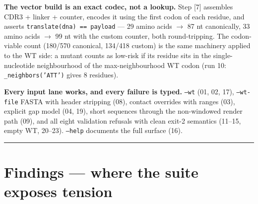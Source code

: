 \documentclass{article}
\begin{document}
\textbf{The vector build is an exact codec, not a lookup.} Step [7] assembles
CDR3 + linker + counter, encodes it using the first codon of each residue, and
asserts \texttt{translate(dna) == payload} --- 29 amino acids \(\to\) 87 nt
canonically, 33 amino acids \(\to\) 99 nt with the custom counter, both
round-tripping. The codon-viable count (180/570 canonical, 134/418 custom) is the
same machinery applied to the WT side: a mutant counts as low-risk if its residue
sits in the single-nucleotide neighbourhood of the max-neighbourhood WT codon
(run 10: \texttt{\_neighbors('ATT')} gives 8 residues).

\textbf{Every input lane works, and every failure is typed.} \texttt{--wt}
(01, 02, 17), \texttt{--wt-file} FASTA with header stripping (08), contact
overrides with ranges (03), explicit gap model (04, 19), short sequences through
the non-windowed render path (09), and all eight validation refusals with clean
exit-2 semantics (11--15, empty WT, 20--23). \texttt{--help} documents the full
surface (16).

\hrule
\section{Findings --- where the suite exposes tension}
\end{document}
